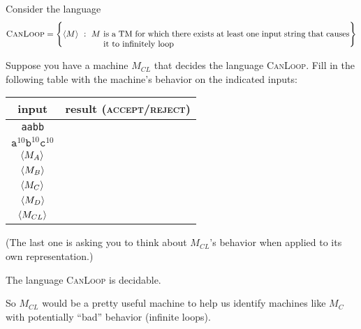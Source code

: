 \documentclass[twoside,letterpaper,openany]{book}
\begin{document}
\begin{exer2}
Consider the language
\[ \textsc{CanLoop} = \setbuild{\repof M}{M~\parbox[t]{4in}{\textrm{is a TM for which there exists at least one input string that causes it to infinitely loop}}} \]

 Suppose you have a machine $M_{CL}$ that decides the language \textsc{CanLoop}. Fill in the following table with the machine's behavior on the indicated inputs:

\begin{center}
\renewcommand{\arraystretch}{1.25}
\begin{tabular}[c]{c|c}
input & result (\textsc{accept}/\textsc{reject}) \\\hline
\texttt{aabb} & \\
$\texttt{a}^{10}\texttt{b}^{10}\texttt{c}^{10}$ & \\
${\langle{M_{A}}\rangle}$ & \\
${\langle{M_{B}}\rangle}$ & \\
${\langle{M_{C}}\rangle}$ & \\
${\langle{M_{D}}\rangle}$ & \\
${\langle{M_{CL}}\rangle}$ & \\
\end{tabular}
\end{center}

(The last one is asking you to think about $M_{CL}$'s behavior when applied to its own representation.)

\end{exer2}

\begin{stmt3}
The language \textsc{CanLoop} is decidable.
\end{stmt3}

\begin{discussion}
So $M_{CL}$ would be a pretty useful machine to help us identify machines like $M_C$ with potentially ``bad'' behavior (infinite loops).
\end{discussion}
\end{document}

